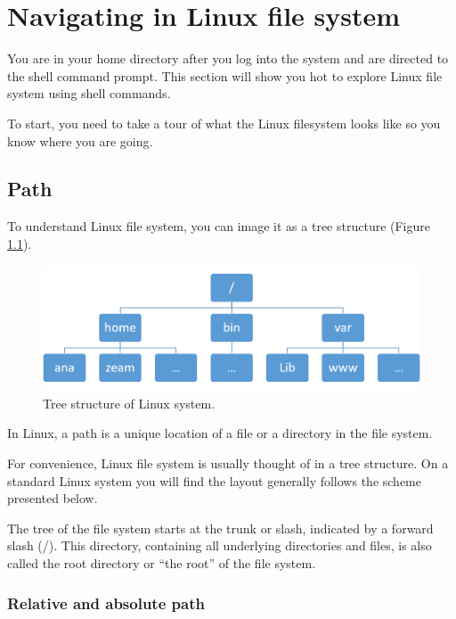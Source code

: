 \documentclass[]{book}
\begin{document}
\hypertarget{navigating-in-linux-file-system}{%
\chapter{Navigating in Linux file system}\label{navigating-in-linux-file-system}}

You are in your home directory after you log into the system and are directed to the shell command prompt. This section will show you hot to explore Linux file system using shell commands.

To start, you need to take a tour of what the Linux filesystem looks like so you know where you are going.

\hypertarget{path}{%
\section{Path}\label{path}}

To understand Linux file system, you can image it as a tree structure (Figure \ref{fig:linuxTreeStruc}).



\begin{figure}
\centering
\includegraphics{figures/LinuxPathTree.png}
\caption{\label{fig:linuxTreeStruc}Tree structure of Linux system.}
\end{figure}

In Linux, a path is a unique location of a file or a directory in the file system.

For convenience, Linux file system is usually thought of in a tree structure. On a standard Linux system you will find the layout generally follows the scheme presented below.

The tree of the file system starts at the trunk or slash, indicated by a forward slash (/). This directory, containing all underlying directories and files, is also called the root directory or ``the root'' of the file system.

\hypertarget{relative-and-absolute-path}{%
\subsection{Relative and absolute path}\label{relative-and-absolute-path}}
\end{document}
